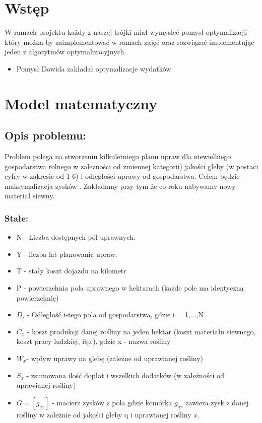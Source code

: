 \documentclass[12pt,a4paper]{article}
\begin{document}
\tableofcontents

\section{Wstęp}
W ramach projektu każdy z naszej trójki miał wymysleć pomysł optymalizacji który można by zaimplementować w ramach zajęć oraz rozwiązać implementując jeden z algorytmów optymalizacyjnych.

\begin{itemize}
	\item Pomysł Dawida zakładał optymalizacje wydatków 
\end{itemize} 


\section{Model matematyczny}

	\subsection{Opis problemu:}
	Problem polega na stworzeniu kilkuletniego planu upraw dla niewielkiego gospodarstwa rolnego w zależności od zmiennej kategorii) jakości gleby (w postaci cyfry w zakresie od 1-6) i  odległości uprawy od gospodarstwa. Celem będzie maksymalizacja zysków . Zakładamy przy tym że co roku nabywamy nowy materiał siewny.

	\subsubsection{Stałe:}
	\begin{itemize}
		\item N - Liczba dostępnych pól uprawnych.
		
		\item Y - liczba lat planowania upraw.
		
		\item T - stały koszt dojazdu na kilometr
		
		\item P - powierzchnia pola uprawnego w hektarach (każde pole ma identyczną powierzchnię)
		
		\item $ D_i $ -  Odległość i-tego pola od gospodarstwa, gdzie i = 1,...,N
		
		\item $ C_x $ - koszt produkcji danej rośliny na jeden hektar (koszt materiału siewnego, koszt pracy ludzkiej, itp.), gdzie x - nazwa rośliny
		
		\item $ W_x $- wpływ uprawy na glebę (zależne od uprawianej rośliny)
		
		\item $ S_x $ - zsumowana ilość dopłat i  wszelkich dodatków (w zależności od uprawianej rośliny)
		
		\item $ G = [g_{qx}] $ - macierz zysków z pola gdzie komórka  $ g_{qx} $ zawiera zysk z danej rośliny w zależnie od jakości gleby q i uprawianej rośliny $ x $.
	\end{itemize}
\end{document}
